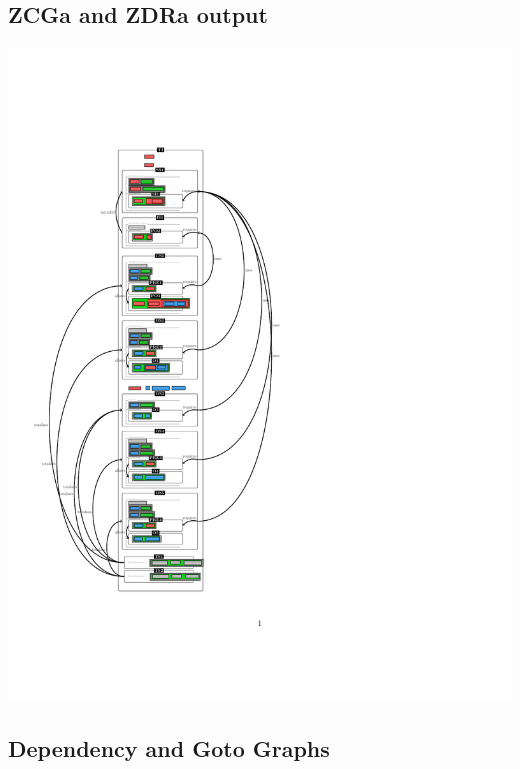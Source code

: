 \subsection{ZCGa and ZDRa output}
\label{app:bb1n2o}
\noindent \includegraphics[clip, trim=0cm 4cm 6cm 4.2cm]{examples/bb/1n2comp.pdf}

\subsection{Dependency and Goto Graphs}
\label{app:bb2.5}

